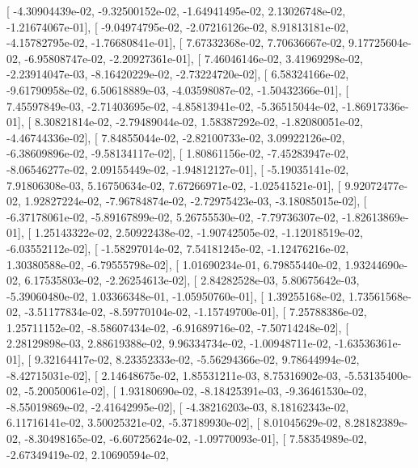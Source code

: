 \documentclass{article}
\begin{document}
       [ -4.30904439e-02,  -9.32500152e-02,  -1.64941495e-02,
          2.13026748e-02,  -1.21674067e-01],
       [ -9.04974795e-02,  -2.07216126e-02,   8.91813181e-02,
         -4.15782795e-02,  -1.76680841e-01],
       [  7.67332368e-02,   7.70636667e-02,   9.17725604e-02,
         -6.95808747e-02,  -2.20927361e-01],
       [  7.46046146e-02,   3.41969298e-02,  -2.23914047e-03,
         -8.16420229e-02,  -2.73224720e-02],
       [  6.58324166e-02,  -9.61790958e-02,   6.50618889e-03,
         -4.03598087e-02,  -1.50432366e-01],
       [  7.45597849e-03,  -2.71403695e-02,  -4.85813941e-02,
         -5.36515044e-02,  -1.86917336e-01],
       [  8.30821814e-02,  -2.79489044e-02,   1.58387292e-02,
         -1.82080051e-02,  -4.46744336e-02],
       [  7.84855044e-02,  -2.82100733e-02,   3.09922126e-02,
         -6.38609896e-02,  -9.58134117e-02],
       [  1.80861156e-02,  -7.45283947e-02,  -8.06546277e-02,
          2.09155449e-02,  -1.94812127e-01],
       [ -5.19035141e-02,   7.91806308e-03,   5.16750634e-02,
          7.67266971e-02,  -1.02541521e-01],
       [  9.92072477e-02,   1.92827224e-02,  -7.96784874e-02,
         -2.72975423e-03,  -3.18085015e-02],
       [ -6.37178061e-02,  -5.89167899e-02,   5.26755530e-02,
         -7.79736307e-02,  -1.82613869e-01],
       [  1.25143322e-02,   2.50922438e-02,  -1.90742505e-02,
         -1.12018519e-02,  -6.03552112e-02],
       [ -1.58297014e-02,   7.54181245e-02,  -1.12476216e-02,
          1.30380588e-02,  -6.79555798e-02],
       [  1.01690234e-01,   6.79855440e-02,   1.93244690e-02,
          6.17535803e-02,  -2.26254613e-02],
       [  2.84282528e-03,   5.80675642e-03,  -5.39060480e-02,
          1.03366348e-01,  -1.05950760e-01],
       [  1.39255168e-02,   1.73561568e-02,  -3.51177834e-02,
         -8.59770104e-02,  -1.15749700e-01],
       [  7.25788386e-02,   1.25711152e-02,  -8.58607434e-02,
         -6.91689716e-02,  -7.50714248e-02],
       [  2.28129898e-03,   2.88619388e-02,   9.96334734e-02,
         -1.00948711e-02,  -1.63536361e-01],
       [  9.32164417e-02,   8.23352333e-02,  -5.56294366e-02,
          9.78644994e-02,  -8.42715031e-02],
       [  2.14648675e-02,   1.85531211e-03,   8.75316902e-03,
         -5.53135400e-02,  -5.20050061e-02],
       [  1.93180690e-02,  -8.18425391e-03,  -9.36461530e-02,
         -8.55019869e-02,  -2.41642995e-02],
       [ -4.38216203e-03,   8.18162343e-02,   6.11716141e-02,
          3.50025321e-02,  -5.37189930e-02],
       [  8.01045629e-02,   8.28182389e-02,  -8.30498165e-02,
         -6.60725624e-02,  -1.09770093e-01],
       [  7.58354989e-02,  -2.67349419e-02,   2.10690594e-02,
\end{document}
